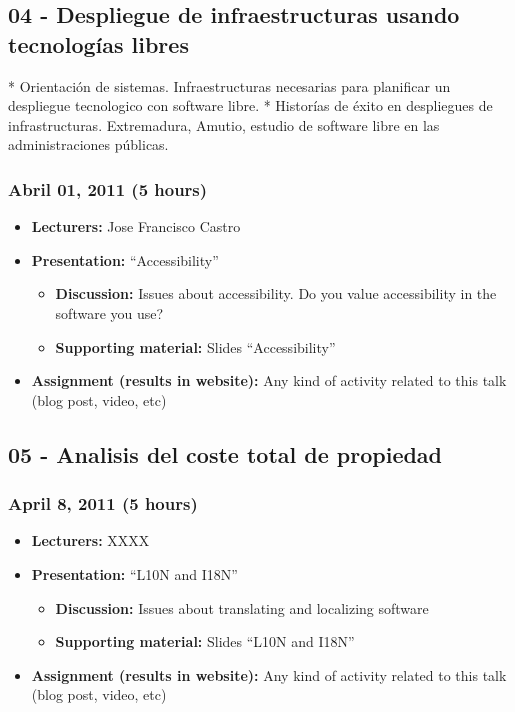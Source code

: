 \documentclass[a4paper]{article}
\begin{document}
\subsection{04 - Despliegue de infraestructuras usando tecnologías libres}

 * Orientación de sistemas. Infraestructuras necesarias para planificar un despliegue tecnologico con software libre. 
 * Historías de éxito en despliegues de infrastructuras. Extremadura, Amutio, estudio de software libre en las administraciones públicas.

\subsubsection{Abril 01, 2011 (5 hours)}

\begin{itemize}
\item \textbf{Lecturers:} Jose Francisco Castro
\item \textbf{Presentation:} ``Accessibility''
  \begin{itemize}
  \item \textbf{Discussion:} Issues about accessibility. Do you value
    accessibility in the software you use?
  \item \textbf{Supporting material:} Slides ``Accessibility''
  \end{itemize}
\item \textbf{Assignment (results in website):} Any kind of activity
  related to this talk (blog post, video, etc)
\end{itemize}


\subsection{05 - Analisis del coste total de propiedad}


\subsubsection{April 8, 2011 (5 hours)}

\begin{itemize}
\item \textbf{Lecturers:} XXXX
\item \textbf{Presentation:} ``L10N and I18N''
  \begin{itemize}
  \item \textbf{Discussion:} Issues about translating and localizing software
  \item \textbf{Supporting material:} Slides ``L10N and I18N''
  \end{itemize}
\item \textbf{Assignment (results in website):} Any kind of activity
  related to this talk (blog post, video, etc)
\end{itemize}
\end{document}
